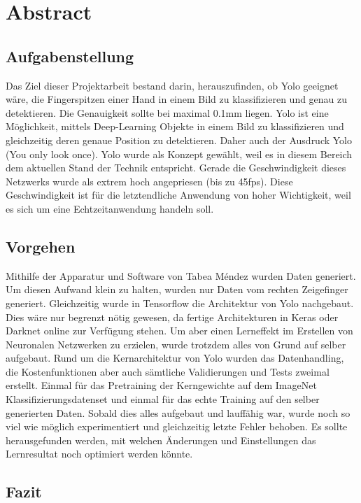 \newpage
\section*{Abstract}
\subsection*{Aufgabenstellung}
Das Ziel dieser Projektarbeit bestand darin, herauszufinden, ob Yolo geeignet wäre, die Fingerspitzen einer Hand in einem Bild zu klassifizieren und genau zu detektieren. 
Die Genauigkeit sollte bei maximal 0.1mm liegen.
Yolo ist eine Möglichkeit, mittels Deep-Learning Objekte in einem Bild zu klassifizieren und gleichzeitig deren genaue Position zu detektieren. 
Daher auch der Ausdruck Yolo (You only look once).
Yolo wurde als Konzept gewählt, weil es in diesem Bereich dem aktuellen Stand der Technik entspricht. 
Gerade die Geschwindigkeit dieses Netzwerks wurde als extrem hoch angepriesen (bis zu 45fps).
Diese Geschwindigkeit ist für die letztendliche Anwendung von hoher Wichtigkeit, weil es sich um eine Echtzeitanwendung handeln soll. 

\subsection*{Vorgehen}
Mithilfe der Apparatur und Software von Tabea Méndez \cite{TabeasFingertracking} wurden Daten generiert.
Um diesen Aufwand klein zu halten, wurden nur Daten vom rechten Zeigefinger generiert. 
Gleichzeitig wurde in Tensorflow die Architektur von Yolo nachgebaut. 
Dies wäre nur begrenzt nötig gewesen, da fertige Architekturen in Keras oder Darknet online zur Verfügung stehen.
Um aber einen Lerneffekt im Erstellen von Neuronalen Netzwerken zu erzielen, wurde trotzdem alles von Grund auf selber aufgebaut. 
Rund um die Kernarchitektur von Yolo wurden das Datenhandling, die Kostenfunktionen aber auch sämtliche Validierungen und Tests zweimal erstellt.  
Einmal für das Pretraining der Kerngewichte auf dem ImageNet Klassifizierungsdatenset und einmal für das \grqq{}echte\grqq{} Training auf den selber generierten Daten. 
Sobald dies alles aufgebaut und lauffähig war, wurde noch so viel wie möglich experimentiert und gleichzeitig letzte Fehler behoben. 
Es sollte herausgefunden werden, mit welchen Änderungen und Einstellungen das Lernresultat noch optimiert werden könnte.    

\subsection*{Fazit}

